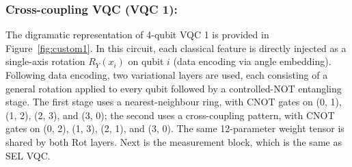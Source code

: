 \documentclass[runningheads]{llncs}
\begin{document}
\subsubsection{Cross-coupling VQC (VQC 1): }The digramatic representation of 4-qubit VQC 1 is provided in Figure~\ref{fig:custom1}. In this circuit, each classical feature is directly injected as a single-axis rotation $R_Y(x_i)$ on qubit $i$ (data encoding via angle embedding). Following data encoding, two variational layers are used, each consisting of a general rotation applied to every qubit followed by a controlled-NOT entangling stage. The first stage uses a nearest-neighbour ring, with CNOT gates on (0, 1), (1, 2), (2, 3), and (3, 0); the second uses a cross-coupling pattern, with CNOT gates on (0, 2), (1, 3), (2, 1), and (3, 0). The same 12-parameter weight tensor is shared by both Rot layers. Next is the measurement block, which is the same as SEL VQC.   
\end{document}
